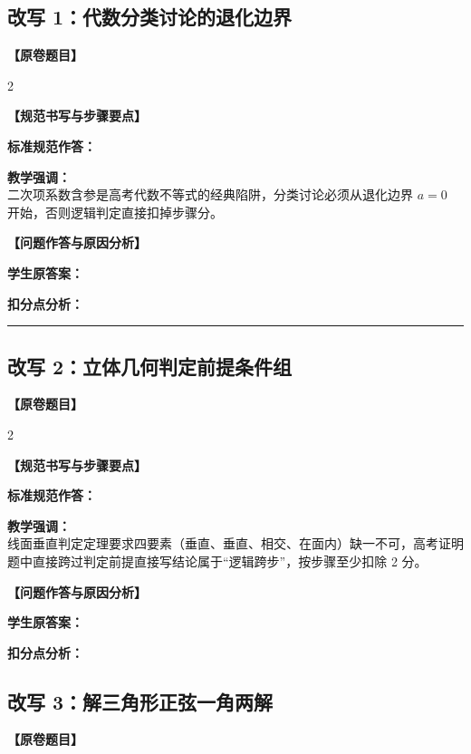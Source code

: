 \documentclass[11pt,a4paper]{ctexart}
\newcommand{\teachblock}[2]{%
  \par\addvspace{0.55em}%
  \noindent\textbf{【#1】}\par\nobreak
  \begingroup
    \raggedright
    \setlength{\parskip}{0.35em}%
    #2\par
  \endgroup
}
\begin{document}
\subsection{改写 1：代数分类讨论的退化边界}
\noindent\textbf{【原卷题目】} \qGeneralCheckOneStem

\begin{paracol}{2}
\teachblock{规范书写与步骤要点}{
  \textbf{标准规范作答：}\\
  \qBadAlgebraCorrect\par
  \textbf{教学强调：}\\
  二次项系数含参是高考代数不等式的经典陷阱，分类讨论必须从退化边界 \(a=0\) 开始，否则逻辑判定直接扣掉步骤分。
}

\switchcolumn
\teachblock{问题作答与原因分析}{
  \textbf{学生原答案：}\\
  \qBadAlgebraWriteup\par
  \textbf{扣分点分析：}\\
  \qBadAlgebraReason
}
\end{paracol}

\addvspace{1.0em}
\hrule
\addvspace{1.0em}

\subsection{改写 2：立体几何判定前提条件组}
\noindent\textbf{【原卷题目】} \qGeneralCheckTwoStem

\begin{paracol}{2}
\teachblock{规范书写与步骤要点}{
  \textbf{标准规范作答：}\\
  \qBadGeometryCorrect\par
  \textbf{教学强调：}\\
  线面垂直判定定理要求四要素（垂直、垂直、相交、在面内）缺一不可，高考证明题中直接跨过判定前提直接写结论属于“逻辑跨步”，按步骤至少扣除 2 分。
}

\switchcolumn
\teachblock{问题作答与原因分析}{
  \textbf{学生原答案：}\\
  \qBadGeometryWriteup\par
  \textbf{扣分点分析：}\\
  \qBadGeometryReason
}
\end{paracol}

\newpage

\subsection{改写 3：解三角形正弦一角两解}
\noindent\textbf{【原卷题目】} \qGeneralCheckThreeStem
\end{document}
